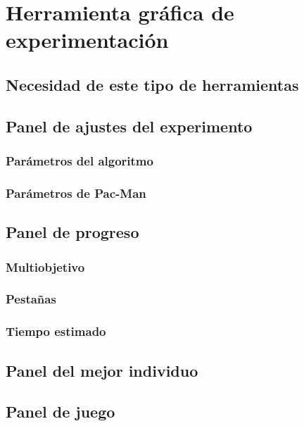 \chapter{Herramienta gráfica de experimentación}

\section{Necesidad de este tipo de herramientas}

\section{Panel de ajustes del experimento}

\subsection{Parámetros del algoritmo}

\subsection{Parámetros de Pac-Man}

\section{Panel de progreso}

\subsection{Multiobjetivo}

\subsection{Pestañas}

\subsection{Tiempo estimado}

\section{Panel del mejor individuo}

\section{Panel de juego}
